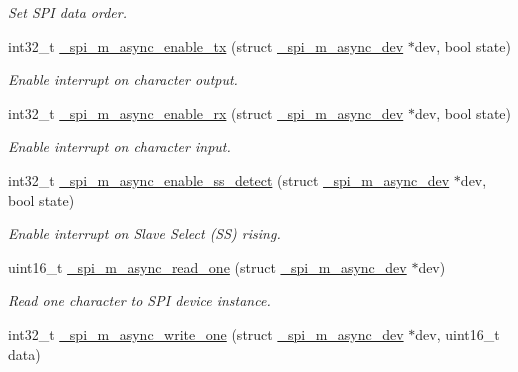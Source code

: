 \begin{DoxyCompactItemize}
\begin{DoxyCompactList}\small\item\em Set S\+PI data order. \end{DoxyCompactList}\item 
int32\+\_\+t \hyperlink{group__hpl__spi_ga1be1b6a4ab1e574d1d5b7e678063a98b}{\+\_\+spi\+\_\+m\+\_\+async\+\_\+enable\+\_\+tx} (struct \hyperlink{group__hpl__spi_gaab37ebaab3686617eb20d5d175e82e6a}{\+\_\+spi\+\_\+m\+\_\+async\+\_\+dev} $\ast$dev, bool state)
\begin{DoxyCompactList}\small\item\em Enable interrupt on character output. \end{DoxyCompactList}\item 
int32\+\_\+t \hyperlink{group__hpl__spi_ga8fc2dc760cf191c7979e2a568bfe33a4}{\+\_\+spi\+\_\+m\+\_\+async\+\_\+enable\+\_\+rx} (struct \hyperlink{group__hpl__spi_gaab37ebaab3686617eb20d5d175e82e6a}{\+\_\+spi\+\_\+m\+\_\+async\+\_\+dev} $\ast$dev, bool state)
\begin{DoxyCompactList}\small\item\em Enable interrupt on character input. \end{DoxyCompactList}\item 
int32\+\_\+t \hyperlink{group__hpl__spi_ga0f88fe411dd9a3bda81b0c035eaf3e80}{\+\_\+spi\+\_\+m\+\_\+async\+\_\+enable\+\_\+ss\+\_\+detect} (struct \hyperlink{group__hpl__spi_gaab37ebaab3686617eb20d5d175e82e6a}{\+\_\+spi\+\_\+m\+\_\+async\+\_\+dev} $\ast$dev, bool state)
\begin{DoxyCompactList}\small\item\em Enable interrupt on Slave Select (SS) rising. \end{DoxyCompactList}\item 
uint16\+\_\+t \hyperlink{group__hpl__spi_ga0210fb0efa281b97063ac82606c30cae}{\+\_\+spi\+\_\+m\+\_\+async\+\_\+read\+\_\+one} (struct \hyperlink{group__hpl__spi_gaab37ebaab3686617eb20d5d175e82e6a}{\+\_\+spi\+\_\+m\+\_\+async\+\_\+dev} $\ast$dev)
\begin{DoxyCompactList}\small\item\em Read one character to S\+PI device instance. \end{DoxyCompactList}\item 
int32\+\_\+t \hyperlink{group__hpl__spi_ga6e4ef571a2b01b191ade58f21686f13c}{\+\_\+spi\+\_\+m\+\_\+async\+\_\+write\+\_\+one} (struct \hyperlink{group__hpl__spi_gaab37ebaab3686617eb20d5d175e82e6a}{\+\_\+spi\+\_\+m\+\_\+async\+\_\+dev} $\ast$dev, uint16\+\_\+t data)

\end{DoxyCompactItemize}
